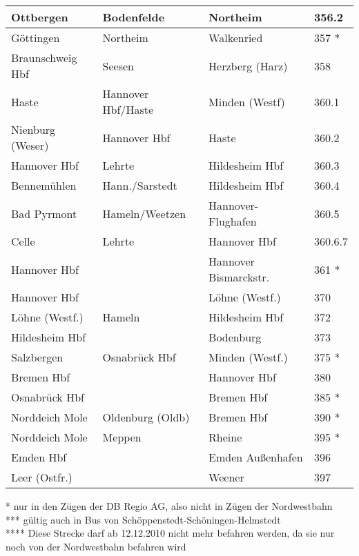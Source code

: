 \begin{tabular}{|l|l|l|p{2cm}|}
Ottbergen & Bodenfelde & Northeim & 356.2 \\ \hline
Göttingen & Northeim & Walkenried & 357 * \\ \hline
Braunschweig Hbf & Seesen & Herzberg (Harz) & 358 \\ \hline
Haste & Hannover Hbf/Haste & Minden (Westf) & 360.1 \\ \hline
Nienburg (Weser) & Hannover Hbf & Haste & 360.2 \\ \hline
Hannover Hbf & Lehrte & Hildesheim Hbf & 360.3 \\ \hline
Bennemühlen & Hann./Sarstedt & Hildesheim Hbf & 360.4 \\ \hline
Bad Pyrmont & Hameln/Weetzen & Hannover-Flughafen & 360.5 \\ \hline
Celle & Lehrte & Hannover Hbf & 360.6.7 \\ \hline
Hannover Hbf &  & Hannover Bismarckstr. & 361 * \\ \hline
Hannover Hbf &  & Löhne (Westf.) & 370 \\ \hline
Löhne (Westf.) & Hameln & Hildesheim Hbf & 372 \\ \hline
Hildesheim Hbf &  & Bodenburg & 373 \\ \hline
Salzbergen & Osnabrück Hbf & Minden (Westf.) & 375 * \\ \hline
Bremen Hbf &  & Hannover Hbf & 380 \\ \hline
Osnabrück Hbf &  & Bremen Hbf & 385 * \\ \hline
Norddeich Mole & Oldenburg (Oldb) & Bremen Hbf & 390 * \\ \hline
Norddeich Mole & Meppen & Rheine & 395 * \\ \hline
Emden Hbf &  & Emden Außenhafen & 396 \\ \hline
Leer (Ostfr.) &  & Weener & 397 \\ \hline
\end{tabular}

* nur in den Zügen der DB Regio AG, also nicht in Zügen der Nordwestbahn\\
*** gültig auch in Bus von  Schöppenstedt-Schöningen-Helmstedt\\
**** Diese Strecke darf ab 12.12.2010 nicht mehr befahren werden, da sie nur noch von der Nordwestbahn befahren wird
\label{streckenliste1}

